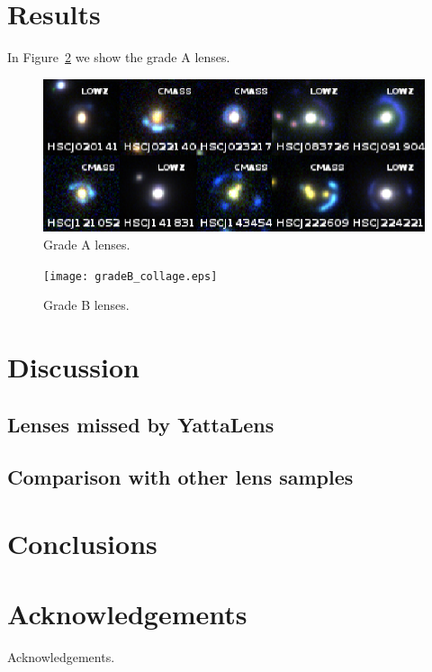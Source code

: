 \documentclass[a4paper,fleqn,usenatbib]{mnras}
\def\Fref#1{Figure~\ref{#1}\xspace}
\begin{document}
\section{Results}
In \Fref{fig:gradeA} we show the grade A lenses.
%
\begin{figure}
 \includegraphics[width=\textwidth]{gradeA_collage.eps}
 \caption{Grade A lenses.}
 \label{fig:gradeA}
\end{figure}
%
%
\begin{figure}
 \texttt{[image: gradeB\_collage.eps]}
 \caption{Grade B lenses.}
 \label{fig:gradeA}
\end{figure}
%
\section{Discussion}

\subsection{Lenses missed by YattaLens}

\subsection{Comparison with other lens samples}

\section{Conclusions}

\section*{Acknowledgements}

Acknowledgements.




%





\bsp	%
\label{lastpage}
\end{document}

